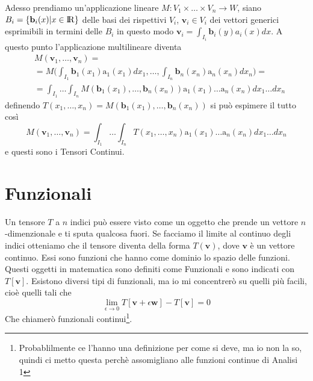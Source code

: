 \documentclass[11pt,a4paper]{report}
\newcommand{\vettore}[1]{\mathbf{#1}}
\newcommand{\vettorec}[1]{\textrm{#1}}
\theoremstyle{definition}
\theoremstyle{plain}
\theoremstyle{plain}
\begin{document}
			Adesso prendiamo un'applicazione lineare $M:V_1\times\dots\times V_n\rightarrow W$, siano $B_i=\{\vettore b_i(x)|x\in \rm I \! R\}$ delle basi dei rispettivi $V_i$, $\vettore v_i \in V_i$ dei vettori generici esprimibili in termini delle $B_i$ in questo modo $\vettore v_i=\int_{I_i} \vettore b_i(y)a_i(x)dx$.
			A questo punto l'applicazione multilineare diventa
			\begin{equation}
			\begin{split}
				& M(\vettore v_1,\dots,\vettore v_n)=\\
				&=M\bigg(\int_{I_1} \vettore b_1(x_1)\vettorec a_1(x_1)dx_1,\dots,\int_{I_n} \vettore b_n(x_n)\vettorec a_n(x_n)dx_n\bigg)=\\
				&=\int_{I_1}\dots\int_{I_n}M(\vettore b_1(x_1),\dots,\vettore b_n(x_n))
				\vettorec a_1(x_1)\dots\vettorec a_n(x_n)dx_1\dots dx_n
			\end{split}
			\end{equation}
			definendo $T(x_1,\dots,x_n)=M(\vettore b_1(x_1),\dots,\vettore b_n(x_n))$ si può espimere il tutto così
			\begin{equation}
			\label{eq:prod_vett_tens}
				M(\vettore v_1,\dots,\vettore v_n)=\int_{I_1}\dots\int_{I_n}T(x_1,\dots,x_n)
				\vettorec a_1(x_1)\dots\vettorec a_n(x_n)dx_1\dots dx_n
			\end{equation}
			e questi sono i Tensori Continui.




		\section{Funzionali}
			Un tensore $T$ a $n$ indici può essere visto come un oggetto che prende un vettore $n$-dimenzionale e ti sputa qualcosa fuori.
			Se facciamo il limite al continuo degli indici otteniamo che il tensore diventa della forma $T(\vettore v)$, dove $\vettore v$ è un vettore continuo.\newline
			Essi sono funzioni che hanno come dominio lo spazio delle funzioni. Questi oggetti in matematica sono definiti come Funzionali e sono indicati con $T[\vettore v]$.\newline
			Esistono diversi tipi di funzionali, ma io mi concentrerò su quelli più facili, cioè quelli tali che
			\begin{equation}
				\lim_{\epsilon 	\to 0}T[\vettore v+\epsilon \vettore w]-T[\vettore v]=0
			\end{equation}
			Che chiamerò funzionali continui\footnote{Probablilmente ce l'hanno una definizione per come si deve, ma io non la so, quindi ci metto questa perchè assomigliano alle funzioni continue di Analisi 1}.
\end{document}
